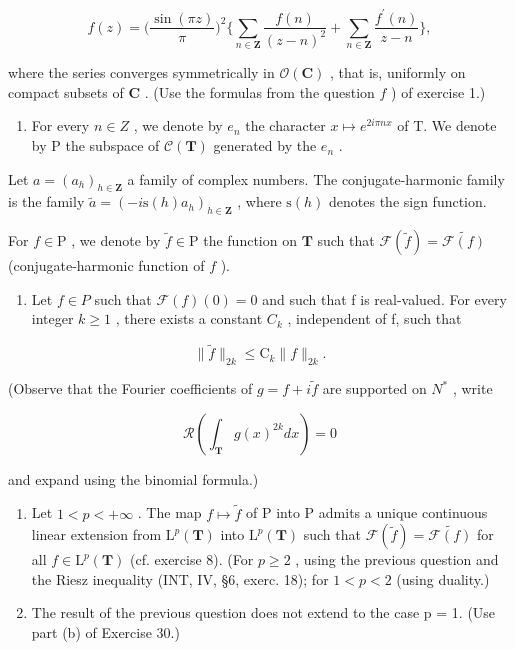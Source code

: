 \[
f (z) = \Big (\frac {\sin (\pi z)}{\pi} \Big) ^ {2} \Big \{\sum_ {n \in \mathbf {Z}} \frac {f (n)}{(z - n) ^ {2}} + \sum_ {n \in \mathbf {Z}} \frac {f ^ {\prime} (n)}{z - n} \Big \},
\]

where the series converges symmetrically in \(\mathcal{O}(\mathbf{C})\) , that is, uniformly on compact subsets of \(\mathbf{C}\) . (Use the formulas from the question \(f\) ) of exercise 1.)

\begin{enumerate}
\def\labelenumi{\arabic{enumi})}
\setcounter{enumi}{37}
\tightlist
\item
  For every \(n \in Z\) , we denote by \(e_{n}\) the character \(x \mapsto e^{2i\pi nx}\) of T. We denote by P the subspace of \(\mathcal{C}(\mathbf{T})\) generated by the \(e_{n}\) .
\end{enumerate}

Let \(a = (a_h)_{h \in \mathbf{Z}}\) a family of complex numbers. The conjugate-harmonic family is the family \(\widetilde{a} = (-i\mathrm{s}(h)a_h)_{h \in \mathbf{Z}}\) , where \(\mathrm{s}(h)\) denotes the sign function.

For \(f \in \mathrm{P}\) , we denote by \(\widetilde{f} \in \mathrm{P}\) the function on \(\mathbf{T}\) such that \(\mathcal{F}(\widetilde{f}) = \widetilde{\mathcal{F}(f)}\) (conjugate-harmonic function of \(f\) ).

\begin{enumerate}
\def\labelenumi{\alph{enumi})}
\tightlist
\item
  Let \(f \in P\) such that \(\mathcal{F}(f)(0) = 0\) and such that f is real-valued. For every integer \(k \geqslant 1\) , there exists a constant \(C_k\) , independent of f, such that
\end{enumerate}

\[
\| \widetilde {f} \| _ {2 k} \leqslant \mathrm{C} _ {k} \| f \| _ {2 k}.
\]

(Observe that the Fourier coefficients of \(g = f + i\tilde{f}\) are supported on \(N^{*}\) , write

\[
\mathcal {R} \left(\int_ {\mathbf {T}} g (x) ^ {2 k} d x\right) = 0
\]

and expand using the binomial formula.)

\begin{enumerate}
\def\labelenumi{\alph{enumi})}
\setcounter{enumi}{1}
\item
  Let \(1 < p < +\infty\) . The map \(f \mapsto \widetilde{f}\) of P into P admits a unique continuous linear extension from \(\mathrm{L}^p(\mathbf{T})\) into \(\mathrm{L}^p(\mathbf{T})\) such that \(\mathcal{F}(\widetilde{f}) = \widetilde{\mathcal{F}(f)}\) for all \(f \in \mathrm{L}^p(\mathbf{T})\) (cf. exercise 8). (For \(p \geqslant 2\) , using the previous question and the Riesz inequality (INT, IV, §6, exerc. 18); for \(1 < p < 2\) (using duality.)
\item
  The result of the previous question does not extend to the case p = 1. (Use part (b) of Exercise 30.)
\end{enumerate}

